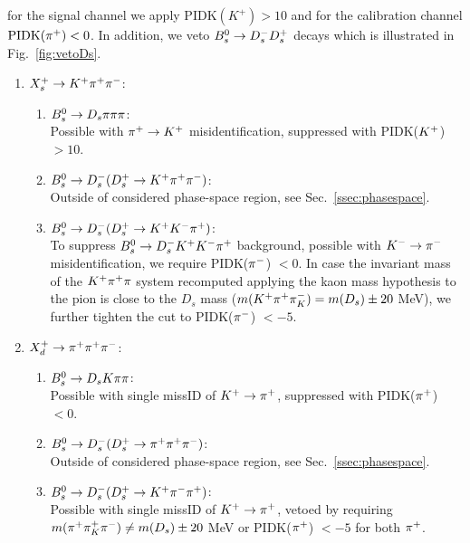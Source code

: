 for the signal channel we apply $\text{PIDK}(K^+) >  10$ and for the calibration channel $\text{PIDK}(\pip) < 0$. 
In addition, we veto $\Bs\to\Dsm\Dsp$ decays which is illustrated in Fig.~\ref{fig:vetoDs}.
 \clearpage
\begin{enumerate}

	\item $X_s^+ \to \Kp \pip \pim$:
		\begin{enumerate}
			\item $\Bs\to\Ds\pion\pion\pion$: \\
			Possible with $\pip \to \Kp$ misidentification, suppressed with PIDK($\Kp$) $>10$.
			
			\item $\Bs\to\Dsm (\Dsp \to \Kp \pip \pim)$: \\ Outside of considered phase-space region, see Sec.~\ref{ssec:phasespace}.

			\item $\Bs\to\Dsm (\Dsp \to \Kp \Km \pip)$: \\
			To suppress $\Bs\to\Dsm \Kp \Km \pip$ background, possible with $\Km \to \pim$ misidentification, we require PIDK($\pim$) $< 0$.
			In case the invariant mass of the $\Kp \pip \pi$ system recomputed applying the kaon mass hypothesis to the pion
			is close to the $D_s$ mass ($m(\Kp \pip \pi^-_K) = m(D_s) \pm 20$ MeV),
			we further tighten the cut to PIDK($\pim$) $< -5$.

		\end{enumerate}

	\item $X_d^+ \to \pip \pip \pim$:
		\begin{enumerate}
			\item $\Bs\to\Ds\kaon\pion\pion$: \\
			Possible with single missID of $\Kp \to \pip$, suppressed with PIDK($\pip$) $<0$.

			\item $\Bs\to\Dsm (\Dsp \to \pip \pip \pim)$:  \\ Outside of considered phase-space region, see Sec.~\ref{ssec:phasespace}.
			
			\item $\Bs\to\Dsm (\Dsp \to \Kp \pim \pip)$: \\
			Possible with single missID of $\Kp \to \pip$, vetoed by requiring
			$m(\pip \pi^+_K \pim) \ne m(D_s) \pm 20$ MeV or PIDK($\pip$) $<-5$ for both $\pip$.
			

		\end{enumerate}
\end{enumerate}


